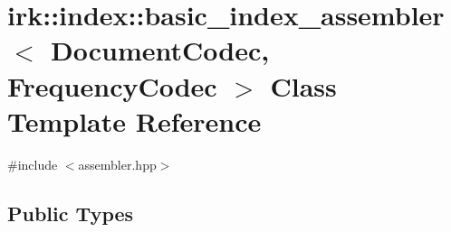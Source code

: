 \hypertarget{classirk_1_1index_1_1basic__index__assembler}{}\section{irk\+:\+:index\+:\+:basic\+\_\+index\+\_\+assembler$<$ Document\+Codec, Frequency\+Codec $>$ Class Template Reference}
\label{classirk_1_1index_1_1basic__index__assembler}


{\ttfamily \#include $<$assembler.\+hpp$>$}

\subsection*{Public Types}
